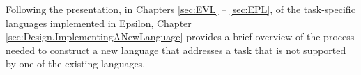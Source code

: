 Following the presentation, in Chapters \ref{sec:EVL} -- \ref{sec:EPL}, of the task-specific languages implemented in Epsilon, Chapter \ref{sec:Design.ImplementingANewLanguage} provides a brief overview of the process needed to construct a new language that addresses a task that is not supported by one of the existing languages.



















